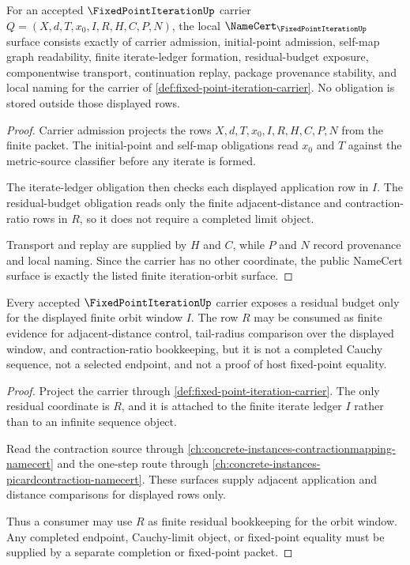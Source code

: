\begin{theorem}
\label{thm:fixed-point-iteration-namecert-obligations}
For an accepted $\FixedPointIterationUp$ carrier $Q=(X,d,T,x_0,I,R,H,C,P,N)$, the local $\NameCert_{\FixedPointIterationUp}$ surface consists exactly of carrier admission, initial-point admission, self-map graph readability, finite iterate-ledger formation, residual-budget exposure, componentwise transport, continuation replay, package provenance stability, and local naming for the carrier of \autoref{def:fixed-point-iteration-carrier}. No obligation is stored outside those displayed rows.
\end{theorem}
\begin{proof}
Carrier admission projects the rows $X,d,T,x_0,I,R,H,C,P,N$ from the finite packet. The initial-point and self-map obligations read $x_0$ and $T$ against the metric-source classifier before any iterate is formed.

The iterate-ledger obligation then checks each displayed application row in $I$. The residual-budget obligation reads only the finite adjacent-distance and contraction-ratio rows in $R$, so it does not require a completed limit object.

Transport and replay are supplied by $H$ and $C$, while $P$ and $N$ record provenance and local naming. Since the carrier has no other coordinate, the public NameCert surface is exactly the listed finite iteration-orbit surface.
\end{proof}

\begin{theorem}
\label{thm:fixed-point-iteration-residual-budget}
Every accepted $\FixedPointIterationUp$ carrier exposes a residual budget only for the displayed finite orbit window $I$. The row $R$ may be consumed as finite evidence for adjacent-distance control, tail-radius comparison over the displayed window, and contraction-ratio bookkeeping, but it is not a completed Cauchy sequence, not a selected endpoint, and not a proof of host fixed-point equality.
\end{theorem}
\begin{proof}
Project the carrier through \autoref{def:fixed-point-iteration-carrier}. The only residual coordinate is $R$, and it is attached to the finite iterate ledger $I$ rather than to an infinite sequence object.

Read the contraction source through \autoref{ch:concrete-instances-contractionmapping-namecert} and the one-step route through \autoref{ch:concrete-instances-picardcontraction-namecert}. These surfaces supply adjacent application and distance comparisons for displayed rows only.

Thus a consumer may use $R$ as finite residual bookkeeping for the orbit window. Any completed endpoint, Cauchy-limit object, or fixed-point equality must be supplied by a separate completion or fixed-point packet.
\end{proof}

